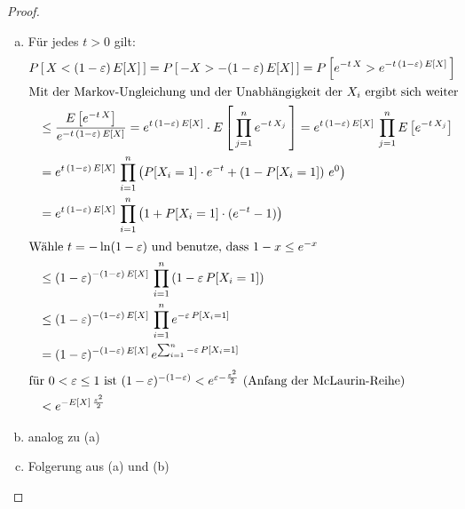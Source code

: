 \begin{proof}
	\begin{enumerate}[(a)]
		\item Für jedes $t > 0$ gilt:
			\begin{align*}
			  P&\left[\,X < (1-\varepsilon)\,E[X]\,\right] =
			  P\left[\,-X > -(1-\varepsilon)\,E[X]\,\right] =
			  P\left[e^{-t\,X}>e^{-t\,(1-\varepsilon)\,E[X]}\,\right]\\
			  \intertext{Mit der Markov-Ungleichung und der
			  Unabhängigkeit der $X_i$ ergibt sich weiter}
			  &\leq
			  \frac{E\left[e^{-t\,X}\right]}{e^{-t\,(1-\varepsilon)\,E[X]}}
			  = e^{t\,(1-\varepsilon)\,E[X]}\cdot
			  E\left[\,\prod_{j=1}^{n} e^{-t\,X_j}\,\right] =
			  e^{t\,(1-\varepsilon)\,E[X]}\,\prod_{j=1}^{n}
			  E\left[e^{-t\,X_j}\right]\\
			  &= e^{t\,(1-\varepsilon)\,E[X]}\,\prod_{i=1}^{n}
			  \left(P[X_i=1]\cdot e^{-t} +
			  \left(1-P[X_i=1]\right)\, e^0\right) \\
			  &= e^{t\,(1-\varepsilon)\,E[X]}\,\prod_{i=1}^{n}
			  \left(1 + P[X_i=1]\cdot(e^{-t} - 1)\right) \\
			  \intertext{Wähle $t=-\ln(1-\varepsilon)$ und benutze,
			  dass $1-x\leq e^{-x}$}
			  &\leq (1-\varepsilon)^{-(1-\varepsilon)\,E[X]}\,
			  \prod_{i=1}^{n}\left(1-\varepsilon\,P[X_i=1]\right) \\
			  &\leq (1-\varepsilon)^{-(1-\varepsilon)\,E[X]}\,
			  \prod_{i=1}^{n} e^{-\varepsilon\,P[X_i=1]} \\
			  &= (1-\varepsilon)^{-(1-\varepsilon)\,E[X]}\,
			  e^{\sum_{i=1}^{n} -\varepsilon\,P[X_i=1]} \\
			  \intertext{für $0<\varepsilon\leq 1$ ist
			  $(1-\varepsilon)^{-(1-\varepsilon)} < e^{\varepsilon
			  - \frac{\varepsilon^2}{2}}$ (Anfang der
			  McLaurin-Reihe)}
			  &< e^{-E[X]\,\frac{\varepsilon^2}{2}}
			\end{align*}
		\item analog zu (a)
		\item Folgerung aus (a) und (b)
	\end{enumerate}
\end{proof}

